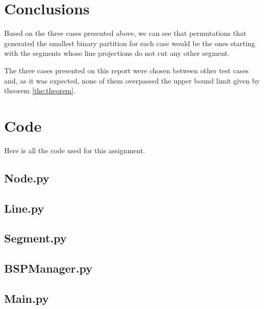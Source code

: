 \documentclass{article}
\begin{document}
\section{Conclusions}

Based on the three cases presented above, we can see that permutations that generated the smallest binary partition for each case would be the ones starting with the segments whose line projections do not cut any other segment. 

The three cases presented on this report were chosen between other test cases and, as it was expected, none of them overpassed the upper bound limit given by theorem \ref{the:theorem}.

\cleardoublepage
\appendix
\section{Code}
Here is all the code used for this assignment.
\subsection{Node.py}

\subsection{Line.py}

\subsection{Segment.py}\label{sec:segment.py}

\subsection{BSPManager.py}\label{sec:BSPManager.py}

\subsection{Main.py}\label{sec:Main.py}

\end{document}
